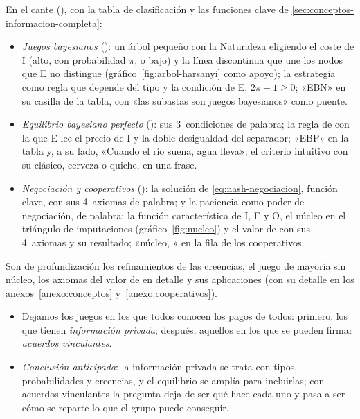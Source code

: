 \documentclass[11pt]{article}
\begin{document}
\begin{notaopositor}
En el cante (), con la tabla de clasificación y las funciones clave de \ref{sec:conceptos-informacion-completa}:
\begin{itemize}
\item \emph{Juegos bayesianos} (): un árbol pequeño con la Naturaleza eligiendo el coste de \textup{I} (alto, con probabilidad $\pi$, o bajo) y la línea discontinua que une los nodos que E no distingue (gráfico~\ref{fig:arbol-harsanyi} como apoyo); la estrategia como regla que depende del tipo y la condición de E, $2\pi-1\geq0$; «EBN» en su casilla de la tabla, con «las subastas son juegos bayesianos» como puente.
\item \emph{Equilibrio bayesiano perfecto} (): sus 3~condiciones de palabra; la regla de  con la que E lee el precio de \textup{I} y la doble desigualdad del separador; «EBP» en la tabla y, a su lado, «Cuando el río suena, agua lleva»; el criterio intuitivo con su clásico, cerveza o quiche, en una frase.
\item \emph{Negociación y cooperativos} (): la solución de  \eqref{eq:nash-negociacion}, función clave, con sus 4~axiomas de palabra;  y la paciencia como poder de negociación, de palabra; la función característica de \textup{I}, E y O, el núcleo en el triángulo de imputaciones (gráfico~\ref{fig:nucleo}) y el valor de  con sus 4~axiomas y su resultado; «núcleo, » en la fila de los cooperativos.
\end{itemize}
Son de profundización los refinamientos de las creencias, el juego de mayoría sin núcleo, los axiomas del valor de  en detalle y sus aplicaciones (con su detalle en los anexos~\ref{anexo:conceptos} y~\ref{anexo:cooperativos}).
\end{notaopositor}

\begin{itemize}
\item Dejamos los juegos en los que todos conocen los pagos de todos: primero, los que tienen \emph{información privada}; después, aquellos en los que se pueden firmar \emph{acuerdos vinculantes}.
\item \emph{Conclusión anticipada}: la información privada se trata con tipos, probabilidades y creencias, y el equilibrio se amplía para incluirlas; con acuerdos vinculantes la pregunta deja de ser qué hace cada uno y pasa a ser cómo se reparte lo que el grupo puede conseguir.
\end{itemize}
\end{document}
